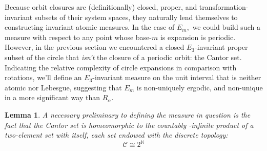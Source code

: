 \documentclass[12pt, letterpaper, oneside]{book}
\newcommand{\ga}{\ensuremath{\alpha}}
\newcommand{\N}{\mathbb{N}}
\theoremstyle{plain}
\newtheorem{lemma}[theorem]{Lemma}
\theoremstyle{definition}
\theoremstyle{remark}
\begin{document}
Because orbit closures are (definitionally) closed, proper, and transformation-invariant subsets of their system spaces, they naturally lend themselves to constructing invariant atomic measures. In the case of $E_m,$ we could build such a measure with respect to any point whose base-$m$ is expansion is periodic. However,  in the previous section we encountered a closed $E_3$-invariant proper subset of the circle that \textit{isn't} the closure of a periodic orbit: the Cantor set. Indicating the relative complexity of circle expansions in comparison with rotations, we'll define an $E_3$-invariant measure on the unit interval that is neither atomic nor Lebesgue, suggesting that $E_m$ is non-uniquely ergodic, and non-unique in a more significant way than $R_\ga.$ 

\begin{lemma}
A necessary preliminary to defining the measure in question is the fact that the Cantor set is homeomorphic to the countably -infinite product of a two-element set with itself, each set endowed with the discrete topology:
\[
\mathcal{C} \cong 2^\N
\]
\end{lemma}
\end{document}
